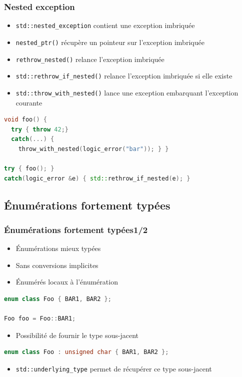\documentclass[C++.tex]{subfiles}
\begin{document}
\begin{frame}[fragile]
	\frametitle{Nested exception}
	\begin{itemize}
		\item \lstinline|std::nested_exception| contient une exception imbriquée
		\item \lstinline|nested_ptr()| récupère un pointeur sur l'exception imbriquée
		\item \lstinline|rethrow_nested()| relance l'exception imbriquée
		\item \lstinline|std::rethrow_if_nested()| relance l'exception imbriquée si elle existe
		\item \lstinline|std::throw_with_nested()| lance une exception embarquant l'exception courante
	\end{itemize}

	\begin{lstlisting}[language=C++]
void foo() {
  try { throw 42;}
  catch(...) { 
    throw_with_nested(logic_error("bar")); } }

try { foo(); }
catch(logic_error &e) { std::rethrow_if_nested(e); }\end{lstlisting}
\end{frame}

\subsection*{Énumérations fortement typées}
\begin{frame}[fragile]
	\frametitle{Énumérations fortement typées\titlehfill{}1/2}
	\begin{itemize}
		\item Énumérations mieux typées
		\item Sans conversions implicites


		\item Énumérés locaux à l'énumération
	\end{itemize}

	\begin{lstlisting}[language=C++]
enum class Foo { BAR1, BAR2 };

Foo foo = Foo::BAR1;\end{lstlisting}

	\begin{itemize}
		\item Possibilité de fournir le type sous-jacent

	\end{itemize}

	\begin{lstlisting}[language=C++]
enum class Foo : unsigned char { BAR1, BAR2 };\end{lstlisting}

	\begin{itemize}
		\item \lstinline|std::underlying_type| permet de récupérer ce type sous-jacent
	\end{itemize}
\end{frame}
\end{document}
